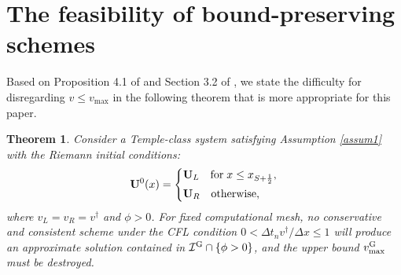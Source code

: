\documentclass[times,final,11pt]{elsarticle}
\newtheorem{theorem}{Theorem}[section]
\numberwithin{equation}{section}
\theoremstyle{definition}
\theoremstyle{remark}
\begin{document}
\section{The feasibility of bound-preserving schemes}\label{0sec2}

Based on Proposition 4.1 of \cite{betancourt2018random} and Section 3.2 of \cite{chalons2007transport}, we state the difficulty for disregarding $v \leq v_{\max}$ in the following theorem that is more appropriate for this paper.
\begin{theorem}
\label{contradiction}
	Consider a Temple-class system satisfying Assumption \ref{assum1} with the Riemann initial conditions:
	\begin{equation*}
		\mathbf{U}^0 (x) = \left\{
		\begin{aligned}
			& \mathbf{U}_L \quad {\rm for} \; x \leq x_{S + \frac{1}{2}}, \\
			& \mathbf{U}_R \quad {\rm otherwise},
		\end{aligned}
		\right.
	\end{equation*}
	where $v_L = v_R = v^{\dag}$ and $\phi > 0$. 
	For fixed computational mesh, no conservative and consistent scheme under the CFL condition $0 < \Delta t_n v^{\dag} / \Delta x \leq 1$
	will produce an approximate solution contained in $\mathcal{I}^{\rm G} \cap \{\phi > 0\}$, and the upper bound $v_{\rm max}^{\rm G}$ must be destroyed.
\end{theorem}
\end{document}
